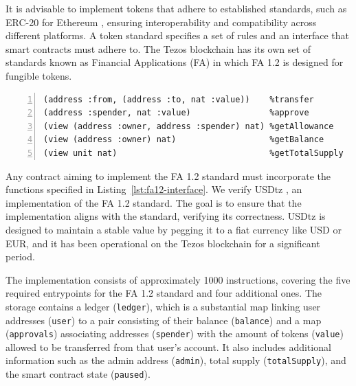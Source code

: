 \documentclass[runningheads]{llncs}
\begin{document}
It is advisable to implement tokens that adhere to established standards, such as ERC-20 \cite{erc} for Ethereum \cite{eth-whitepaper}, ensuring interoperability and compatibility across different platforms. A token standard specifies a set of rules and an interface that smart contracts must adhere to. The Tezos blockchain has its own set of standards known as Financial Applications (FA) in which FA 1.2 \cite{fa} is designed for fungible tokens.
\begin{lstlisting}[float=tp,captionpos=b,caption={FA 1.2 interface},label={lst:fa12-interface},numbers=left]
(address :from, (address :to, nat :value))    %transfer
(address :spender, nat :value)                %approve
(view (address :owner, address :spender) nat) %getAllowance
(view (address :owner) nat)                   %getBalance
(view unit nat)                               %getTotalSupply
\end{lstlisting}

Any contract aiming to implement the FA 1.2 standard must incorporate the functions specified in Listing~\ref{lst:fa12-interface}. We verify USDtz \cite{usdtzimplemetation, tzstatsusdtz}, an implementation of the FA 1.2 standard. The goal is to ensure that the implementation aligns with the standard, verifying its correctness. USDtz is designed to maintain a stable value by pegging it to a fiat currency like USD or EUR, and it has been operational on the Tezos blockchain for a significant period.

The implementation consists of approximately 1000 instructions, covering the five required entrypoints for the FA 1.2 standard and four additional ones. The storage contains a ledger (\lstinline/ledger/), which is a substantial map linking user addresses (\lstinline/user/) to a pair consisting of their balance (\lstinline/balance/) and a map (\lstinline/approvals/) associating addresses (\lstinline/spender/) with the amount of tokens (\lstinline/value/) allowed to be transferred from that user's account. It also includes additional information such as the admin address (\lstinline/admin/), total supply (\lstinline/totalSupply/), and the smart contract state (\lstinline/paused/).
\end{document}
